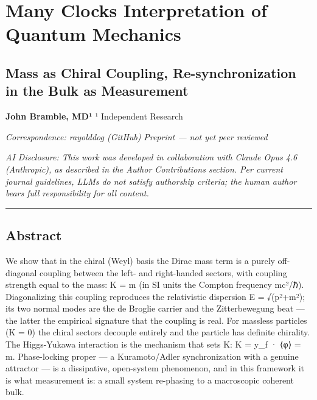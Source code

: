 \documentclass[
]{article}
\author{}
\date{}
\begin{document}
\section{Many Clocks Interpretation of Quantum
Mechanics}\label{many-clocks-interpretation-of-quantum-mechanics}

\subsection{Mass as Chiral Coupling, Re-synchronization in the Bulk as
Measurement}\label{mass-as-chiral-coupling-re-synchronization-in-the-bulk-as-measurement}

\textbf{John Bramble, MD¹} ¹ Independent Research

\emph{Correspondence: rayolddog (GitHub)} \emph{Preprint --- not yet
peer reviewed}

\emph{AI Disclosure: This work was developed in collaboration with
Claude Opus 4.6 (Anthropic), as described in the Author Contributions
section. Per current journal guidelines, LLMs do not satisfy authorship
criteria; the human author bears full responsibility for all content.}

\begin{center}\rule{0.5\linewidth}{0.5pt}\end{center}

\subsection{Abstract}\label{abstract}

We show that in the chiral (Weyl) basis the Dirac mass term is a purely
off-diagonal coupling between the left- and right-handed sectors, with
coupling strength equal to the mass: K = m (in SI units the Compton
frequency mc²/ℏ). Diagonalizing this coupling reproduces the
relativistic dispersion E = √(p²+m²); its two normal modes are the de
Broglie carrier and the Zitterbewegung beat --- the latter the empirical
signature that the coupling is real. For massless particles (K = 0) the
chiral sectors decouple entirely and the particle has definite
chirality. The Higgs-Yukawa interaction is the mechanism that sets K: K
= y\_f · ⟨φ⟩ = m. Phase-locking proper --- a Kuramoto/Adler
synchronization with a genuine attractor --- is a dissipative,
open-system phenomenon, and in this framework it is what measurement is:
a small system re-phasing to a macroscopic coherent bulk.
\end{document}
